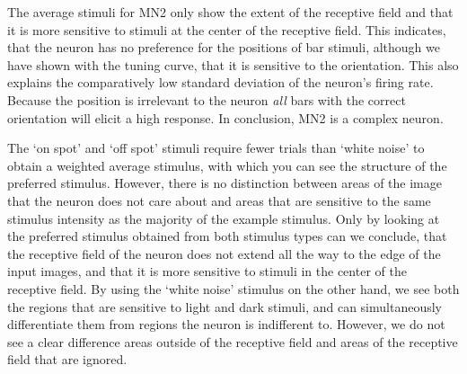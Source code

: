 \documentclass{scrartcl}
\begin{document}
The average stimuli for MN2 only show the extent of the receptive field and that it is more sensitive to stimuli at the center of the receptive field. This indicates, that the neuron has no preference for the positions of bar stimuli, although we have shown with the tuning curve, that it is sensitive to the orientation. This also explains the comparatively low standard deviation of the neuron's firing rate. Because the position is irrelevant to the neuron \textit{all} bars with the correct orientation will elicit a high response. In conclusion, MN2 is a complex neuron.

The `on spot' and `off spot' stimuli require fewer trials than `white noise' to obtain a weighted average stimulus, with which you can see the structure of the preferred stimulus. However, there is no distinction between areas of the image that the neuron does not care about and areas that are sensitive to the same stimulus intensity as the majority of the example stimulus. Only by looking at the preferred stimulus obtained from both stimulus types can we conclude, that the receptive field of the neuron does not extend all the way to the edge of the input images, and that it is more sensitive to stimuli in the center of the receptive field. By using the `white noise' stimulus on the other hand, we see both the regions that are sensitive to light and dark stimuli, and can simultaneously differentiate them from regions the neuron is indifferent to. However, we do not see a clear difference areas outside of the receptive field and areas of the receptive field that are ignored.
\end{document}
